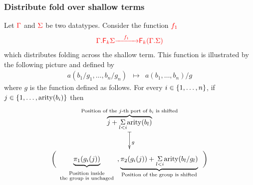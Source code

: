 \subsubsection{Distribute fold over shallow terms}
 Let ${\color{red}{\Gamma}}$ and ${\color{red}{\Sigma}}$ be two datatypes.  Consider the function ${\color{red}{f_1}}$
\begin{align*}
{\color{red}{{\color{red}{\Gamma . {\color{red}{\mathsf F_{k}}}\Sigma}}}} {\color{red}{\xrightarrow{\quad f_1 \quad}}} {\color{red}{{\color{red}{\mathsf F_{k}}}({\color{red}{\Gamma . \Sigma}})}}
\end{align*}
which distributes  folding across the shallow term. This function is illustrated by the following picture
and  defined by 
$$\begin{array}{rcl} 
a(b_1/g_1,\dots,b_n/g_n)&\mapsto& a(b_1,\dots,b_n)/g
\end{array}$$
where $g$ is the function defined as follows. For every  $i \in\{1,\dots,n\}$,  if  $j\in\{1,\dots,\mathrm{arity}(b_i)\}$ then 
 \begin{align*}
 \xymatrix@C=5cm{
 \begin{array}{c}
 \overbrace{j+\underset{l<i}{\Sigma} \arity{b_l}}^{\text{Position of the $j$-th port of $b_i$ is shifted}}
 \end{array}
 \ar@{|->}[d]^{g}\\
 \begin{array}{c}
  \biggl( \underbrace{\pi_1(g_i(j))}_{\begin{array}{c}
{ \scriptsize\text{Position inside}}\\[-5pt]{\scriptsize \text{the group is unchaged}}
 \end{array}},\underbrace{\pi_2(g_i(j))+\underset{l<i}{\Sigma} \arity{b_l/g_l}}_{\text{Position of the group is shifted}} \ \ \biggr)
 \end{array}}
 \end{align*}
 



